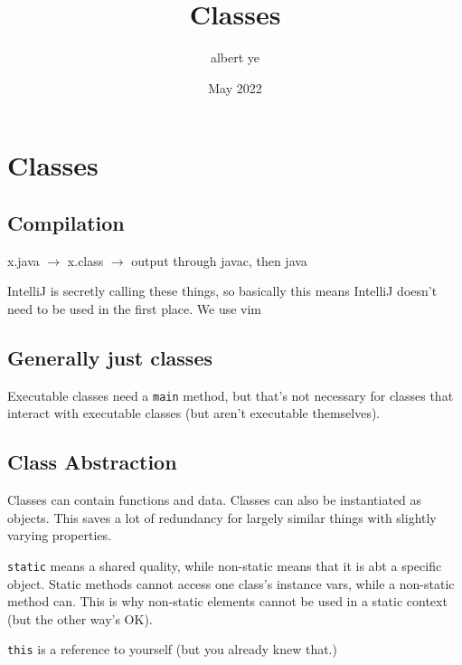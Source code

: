 \documentclass{scrartcl}
\title{Classes}
\author{albert ye}
\date{May 2022}
\begin{document}
\maketitle

\section{Classes}
\subsection{Compilation}
x.java $\rightarrow$ x.class $\rightarrow$ output through javac, then java

IntelliJ is secretly calling these things, so basically this means IntelliJ
doesn't need to be used in the first place. We use vim

\subsection{Generally just classes}

Executable classes need a \texttt{main} method, but that's not necessary for
classes that interact with executable classes (but aren't executable
themselves).

\subsection{Class Abstraction}
Classes can contain functions and data. Classes can also be instantiated
as objects. This saves a lot of redundancy for largely similar things with
slightly varying properties.


\texttt{static} means a shared quality, while non-static means that it is abt
a specific object. Static methods cannot access one class's instance vars,
while a non-static method can. This is why non-static elements cannot 
be used in a static context (but the other way's OK).

\texttt{this} is a reference to yourself (but you already knew that.)
\end{document}
